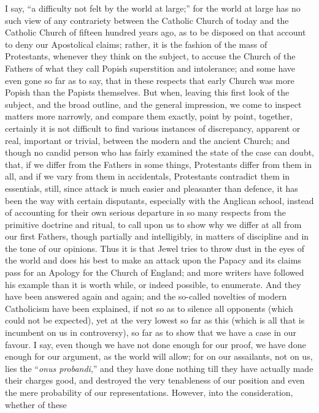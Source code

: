 I say, ``a difficulty not felt by the world at large;'' for
the world at large has no such view of any contrariety between the
Catholic Church of today and the Catholic Church of fifteen hundred
years ago, as to be disposed on that account to deny our Apostolical
claims; rather, it is the fashion of the mass of Protestants, whenever
they think on the subject, to accuse the Church of the Fathers of what
they call Popish superstition and intolerance; and some have even gone
so far as to say, that in these respects that early Church was more
Popish than the Papists themselves. But when, leaving this first look
of the subject, and the broad outline, and the general impression, we
come to inspect matters more narrowly, and compare them exactly, point
by point, together, certainly it is not difficult to find various
instances of discrepancy, apparent or real, important or trivial,
between the modern and the ancient Church; and though no candid person
who has fairly examined the state of the case can doubt, that, if we
differ from the Fathers in some things, Protestants differ from them
in all, and if we vary from them in accidentals, Protestants
contradict them in essentials, still, since attack is much easier and
pleasanter than defence, it has been the way with certain disputants,
especially with the Anglican school, instead of accounting for their
own serious departure in so many respects from the primitive doctrine
and ritual, to call upon us to show why we differ at all from our
first Fathers, though partially and intelligibly, in matters of
discipline and in the tone of our opinions. Thus it is that Jewel
tries to throw dust in the eyes of the world and does his best to make
an attack upon the Papacy and its claims pass for an Apology for the
Church of England; and more writers have followed his example than it
is worth while, or indeed possible, to enumerate. And they have been
answered again and again; and the so-called novelties of modern
Catholicism have been explained, if not so as to silence all opponents
(which could not be expected), yet at the very lowest so far as this
(which is all that is incumbent on us in controversy), so far as to
show that we have a case in our favour. I say, even though we have not
done enough for our proof, we have done enough for our argument, as
the world will allow; for on our assailants, not on us, lies the
``\emph{onus probandi},'' and they have done nothing till they
have actually made their charges good, and destroyed the very
tenableness of our position and even the mere probability of our
representations. However, into the consideration, whether of these
